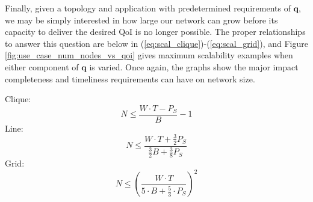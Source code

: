 Finally, given a topology and application with predetermined requirements of $\mathbf{q}$, we may be simply interested in how large our network can grow before its capacity to deliver the desired QoI is no longer possible.  The proper relationships to answer this question are below in (\ref{eq:scal_clique})-(\ref{eq:scal_grid}), and Figure \ref{fig:use_case_num_nodes_vs_qoi} gives maximum scalability examples when either component of $\mathbf{q}$ is varied.  Once again, the graphs show the major impact completeness and timeliness requirements can have on network size.

\vspace{4mm}
\noindent
Clique:
\begin{equation}
	N \leq \frac{W \cdot T - P_S}{B} -1
\label{eq:scal_clique}
\end{equation}
Line:
\begin{equation}
	N \leq \frac{W \cdot T + \frac{3}{2}P_S}{\frac{3}{2}B+\frac{3}{8}P_S}
\label{eq:scal_line}
\end{equation}
Grid:
\begin{equation}
	N \leq (\frac{W \cdot T}{5 \cdot B + \frac{5}{3} \cdot P_S})^2
\label{eq:scal_grid}
\end{equation}


